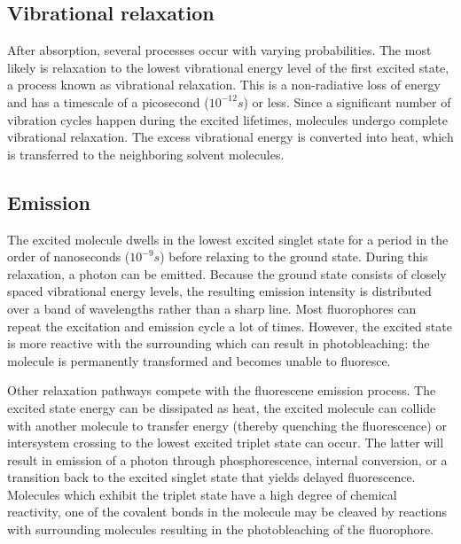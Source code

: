 \documentclass[twoside,single]{lion-msc}
\begin{document}
\subsection{Vibrational relaxation}
After absorption, several processes occur with varying probabilities. The most likely is relaxation to the lowest vibrational energy level of the first excited state, a process known as vibrational relaxation. This is a non-radiative loss of energy and has a timescale of a picosecond ($10^{-12}s$) or less. Since a significant number of vibration cycles happen during the excited lifetimes, molecules undergo complete vibrational relaxation. The excess vibrational energy is converted into heat, which is transferred to the neighboring solvent molecules.

\subsection{Emission}
The excited molecule dwells in the lowest excited singlet state for a period in the order of nanoseconds ($10^{-9}s$) before relaxing to the ground state. During this relaxation, a photon can be emitted. Because the ground state consists of closely spaced vibrational energy levels, the resulting emission intensity is distributed over a band of wavelengths rather than a sharp line. Most fluorophores can repeat the excitation and emission cycle a lot of times. However, the excited state is more reactive with the surrounding which can result in photobleaching: the molecule is permanently transformed and becomes unable to fluoresce. 

Other relaxation pathways compete with the fluorescene emission process. The excited state energy can be dissipated as heat, the excited molecule can collide with another molecule to transfer energy (thereby quenching the fluorescence) or intersystem crossing to the lowest excited triplet state can occur. The latter will result in emission of a photon through phosphorescence, internal conversion, or a transition back to the excited singlet state that yields delayed fluorescence. Molecules which exhibit the triplet state have a high degree of chemical reactivity, one of the covalent bonds in the molecule may be cleaved by reactions with surrounding molecules resulting in the photobleaching of the fluorophore.
\end{document}
